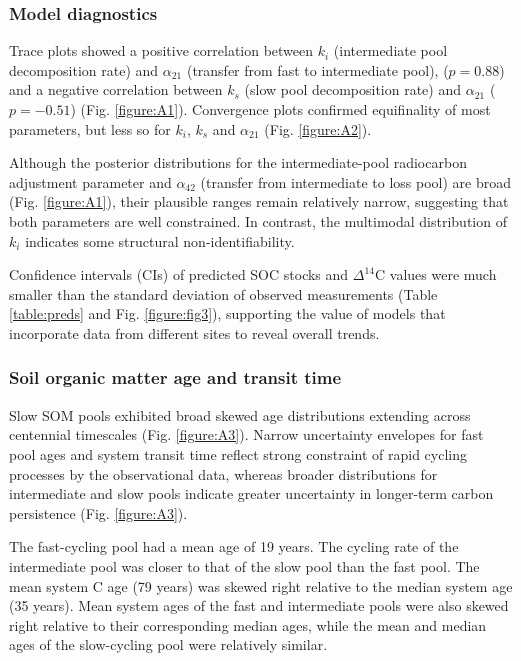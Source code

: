 \documentclass[bg, manuscript]{copernicus}
\begin{document}
\subsubsection{Model diagnostics}
Trace plots showed a positive correlation between $k_i$ (intermediate pool decomposition rate) and $\alpha_{21}$ (transfer from fast to intermediate pool), ($p = 0.88$) and a negative correlation between $k_s$ (slow pool decomposition rate) and $\alpha_{21}$ ($p = -0.51$) (Fig. \ref{figure:A1}). Convergence plots confirmed equifinality of most parameters, but less so for $k_i$, $k_s$ and $\alpha_{21}$ (Fig. \ref{figure:A2}).

Although the posterior distributions for the intermediate-pool radiocarbon adjustment parameter and $\alpha_{42}$ (transfer from intermediate to loss pool) are broad (Fig. \ref{figure:A1}), their plausible ranges remain relatively narrow, suggesting that both parameters are well constrained. In contrast, the multimodal distribution of $k_i$ indicates some structural non-identifiability.

Confidence intervals (CIs) of predicted SOC stocks and $\Delta^{14}\text{C}$ values were much smaller than the standard deviation of observed measurements (Table \ref{table:preds} and Fig. \ref{figure:fig3}), supporting the value of models that incorporate data from different sites to reveal overall trends.

\subsubsection{Soil organic matter age and transit time}
Slow SOM pools exhibited broad skewed age distributions extending across centennial timescales (Fig. \ref{figure:A3}). Narrow uncertainty envelopes for fast pool ages and system transit time reflect strong constraint of rapid cycling processes by the observational data, whereas broader distributions for intermediate and slow pools indicate greater uncertainty in longer-term carbon persistence (Fig. \ref{figure:A3}).

The fast-cycling pool had a mean age of 19 years. The cycling rate of the intermediate pool was closer to that of the slow pool than the fast pool. The mean system C age (79 years) was skewed right relative to the median system age (35 years). Mean system ages of the fast and intermediate pools were also skewed right relative to their corresponding median ages, while the mean and median ages of the slow-cycling pool were relatively similar.
\end{document}

